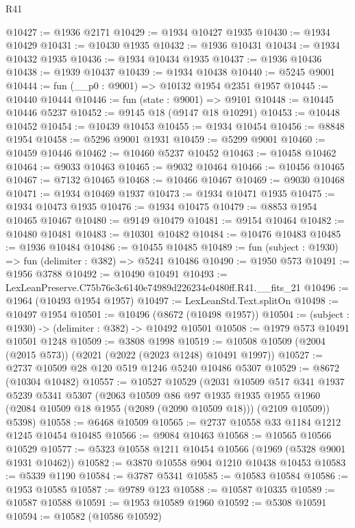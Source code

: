 \begin{lexlean}{R41}
\begin{coremodule}
@10427 := @1936 @2171
@10429 := @1934 @10427 @1935
@10430 := @1934 @10429
@10431 := @10430 @1935
@10432 := @1936 @10431
@10434 := @1934 @10432 @1935
@10436 := @1934 @10434 @1935
@10437 := @1936 @10436
@10438 := @1939 @10437
@10439 := @1934 @10438
@10440 := @5245 @9001
@10444 := fun (__p0 : @9001) => @10132 @1954 @2351 @1957
@10445 := @10440 @10444
@10446 := fun (state : @9001) => @9101
@10448 := @10445 @10446 @5237
@10452 := @9145 @18 (@9147 @18 @10291)
@10453 := @10448 @10452
@10454 := @10439 @10453
@10455 := @1934 @10454
@10456 := @8848 @1954
@10458 := @5296 @9001 @1931
@10459 := @5299 @9001
@10460 := @10459 @10446
@10462 := @10460 @5237 @10452
@10463 := @10458 @10462
@10464 := @9033 @10463
@10465 := @9032 @10464
@10466 := @10456 @10465
@10467 := @7132 @10465
@10468 := @10466 @10467
@10469 := @9030 @10468
@10471 := @1934 @10469 @1937
@10473 := @1934 @10471 @1935
@10475 := @1934 @10473 @1935
@10476 := @1934 @10475
@10479 := @8853 @1954 @10465 @10467
@10480 := @9149 @10479
@10481 := @9154 @10464
@10482 := @10480 @10481
@10483 := @10301 @10482
@10484 := @10476 @10483
@10485 := @1936 @10484
@10486 := @10455 @10485
@10489 := fun (subject : @1930) => fun (delimiter : @382) => @5241 @10486
@10490 := @1950 @573
@10491 := @1956 @3788
@10492 := @10490 @10491
@10493 := LexLeanPreserve.C75b76e3c6140e74989d226234e0480ff.R41.__fits_21
@10496 := @1964 (@10493 @1954 @1957)
@10497 := LexLeanStd.Text.splitOn
@10498 := @10497 @1954
@10501 := @10496 (@8672 (@10498 @1957))
@10504 := (subject : @1930) -> (delimiter : @382) -> @10492 @10501
@10508 := @1979 @573 @10491 @10501 @1248
@10509 := @3808 @1998
@10519 := @10508 @10509 (@2004 (@2015 @573)) (@2021 (@2022 (@2023 @1248) @10491 @1997))
@10527 := @2737 @10509 @28 @120 @519 @1246 @5240 @10486 @5307
@10529 := @8672 (@10304 @10482)
@10557 := @10527
    @10529
    (@2031
      @10509
      @517
      @341
      @1937
      @5239
      @5341
      @5307
      (@2063
        @10509
        @86
        @97
        @1935
        @1935
        @1955
        @1960
        (@2084 @10509 @18 @1955 (@2089 (@2090 @10509 @18)))
        (@2109 @10509))
      @5398)
@10558 := @6468 @10509
@10565 := @2737 @10558 @33 @1184 @1212 @1245 @10454 @10485
@10566 := @9084 @10463
@10568 := @10565 @10566 @10529
@10577 := @5323 @10558 @1211 @10454 @10566 (@1969 (@5328 @9001 @1931 @10462))
@10582 := @3870 @10558 @904 @1210 @10438 @10453
@10583 := @5339 @1190
@10584 := @3787 @5341
@10585 := @10583 @10584
@10586 := @1953 @10585
@10587 := @9789 @123
@10588 := @10587 @10335
@10589 := @10587 @10588
@10591 := @1953 @10589 @1960
@10592 := @5308 @10591
@10594 := @10582 (@10586 @10592)

\end{coremodule}
\end{lexlean}
